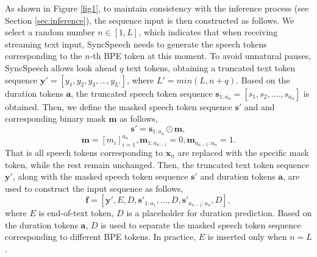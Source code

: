 As shown in Figure \ref{fig1}, to maintain consistency with the inference process (see Section \ref{sec:inference}), the sequence input is then constructed as follows. We select a random number $n \in [1, L]$, which indicates that when receiving streaming text input, SyncSpeech needs to  generate the speech tokens corresponding to the $n$-th BPE token  at this moment. To avoid unnatural pauses, SyncSpeech allows look ahead $q$ text tokens, obtaining a truncated text token sequence $\boldsymbol{y}' = [y_1, y_2, y_3, ..., y_{L'}]$, where $L'=min(L, n+q)$. Based on the duration tokens $\boldsymbol{a}$, the truncated speech token sequence $\boldsymbol{s}_{1:a_{n}}=[s_1, s_2, ...., s_{a_{n}}]$ is obtained. Then, we define the masked speech token sequence $\boldsymbol{s}'$ and and corresponding binary mask 
$\boldsymbol{m}$ as follows, 
\begin{equation}
\boldsymbol{s}' = \boldsymbol{s}_{1:a_{n}} \odot \boldsymbol{m},
\end{equation}
\begin{equation}
    \boldsymbol{m}=[m_{i}]_{i=1}^{a_{n}}, \boldsymbol{m}_{1:a_{n-1}}=0, \boldsymbol{m}_{a_{n-1}:a_{n}}=1.
\end{equation}
That is all speech tokens corresponding to $\boldsymbol{x}_{n}$ are replaced with the specific mask token, while the rest remain unchanged.  Then, the truncated text token sequence $\boldsymbol{y}'$, along with the masked speech token sequence $\boldsymbol{s}'$ and duration tokens $\boldsymbol{a}$, are used to construct the input sequence as follows,
\begin{equation}
\boldsymbol{f} = [\boldsymbol{y}',E, D, \boldsymbol{s}'_{1:a_1},..., D, \boldsymbol{s}'_{a_{n-1}:a_n}, D],
\label{eq1}
\end{equation}
where $E$ is end-of-text token, $D$ is a placeholder for duration prediction. 
Based on the duration tokens $\boldsymbol{a}$, $D$ is used to separate the masked speech token sequence corresponding to different BPE tokens. In practice, $E$ is inserted only when $n=L$ .


